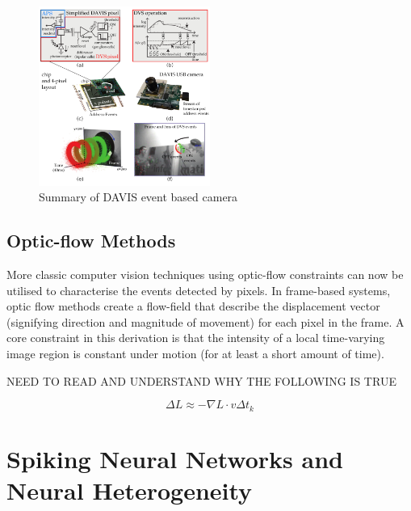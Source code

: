 \begin{figure}[htb]
      \centering
      \includegraphics[width=0.5\textwidth]{background/images/davis_camera.png}
      \caption{Summary of DAVIS event based camera\cite{EventBasedVisionASurvery}}
      \label{fig:davis_camera}
\end{figure}

\subsection{Optic-flow Methods}

More classic computer vision techniques using optic-flow constraints can now be utilised to characterise the events detected by pixels. In frame-based systems, optic flow methods create a flow-field that describe the displacement vector (signifying direction and magnitude of movement) for each pixel in the frame. A core constraint in this derivation is that the intensity of a local time-varying image region is constant under motion (for at least a short amount of time)\cite{GenerativeEventModel}.

\color{red} NEED TO READ AND UNDERSTAND WHY THE FOLLOWING IS TRUE \cite{GenerativeEventModel} \cite{EventBasedVisionASurvery} \color{black}

$$ \Delta L \approx -\nabla L \cdot v \Delta t_k $$

\section{Spiking Neural Networks and Neural Heterogeneity}

